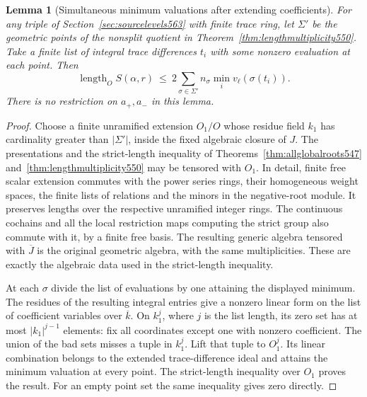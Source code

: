 \documentclass[a4paper,11pt]{article}
\newtheorem{lemma}[proposition]{Lemma}
\theoremstyle{definition}
\theoremstyle{remark}
\numberwithin{equation}{section}
\begin{document}
\begin{lemma}[Simultaneous minimum valuations after extending coefficients]
\leavevmode\label{lem:exacttests567}
For any triple of Section~\ref{sec:sourcelevels563} with finite
trace ring, let \(\Sigma'\) be the geometric points of the
nonsplit quotient in Theorem~\ref{thm:lengthmultiplicity550}.
Take a finite list of integral trace differences \(t_i\) with
some nonzero evaluation at each point. Then
\[
  \operatorname{length}_O S(\alpha,r)
        \ \le\ 2\sum_{\sigma\in\Sigma'} n_\sigma
                          \min_i v_\ell(\sigma(t_i)).
\]
There is no restriction on \(a_+,a_-\) in this lemma.
\end{lemma}
\begin{proof}
Choose a finite unramified extension \(O_1/O\) whose residue
field \(k_1\) has cardinality greater than \(|\Sigma'|\),
inside the fixed algebraic closure of \(J\). The presentations
and the strict-length inequality of Theorems~\ref{thm:allglobalroots547}
and~\ref{thm:lengthmultiplicity550} may be tensored with \(O_1\).
In detail, finite free scalar extension commutes with the power
series rings, their homogeneous weight spaces, the finite lists
of relations and the minors in the negative-root module.
It preserves lengths over the respective unramified integer
rings. The continuous cochains and all the local restriction
maps computing the strict group also commute with it, by a
finite free basis. The resulting generic algebra tensored with
\(\overline J\) is the original geometric algebra, with the
same multiplicities. These are exactly the algebraic data
used in the strict-length inequality.

At each \(\sigma\) divide the list of evaluations by one
attaining the displayed minimum. The residues of the resulting
integral entries give a nonzero linear form on the list of
coefficient variables over \(\overline{k}\). On \(k_1^j\),
where \(j\) is the list length, its zero set has at most
\(|k_1|^{j-1}\) elements: fix all coordinates except one
with nonzero coefficient. The union of the bad sets misses
a tuple in \(k_1^j\). Lift that tuple to \(O_1^j\). Its
linear combination belongs to the extended trace-difference
ideal and attains the minimum valuation at every point.
The strict-length inequality over \(O_1\) proves the result.
For an empty point set the same inequality gives zero directly.
\end{proof}
\end{document}
